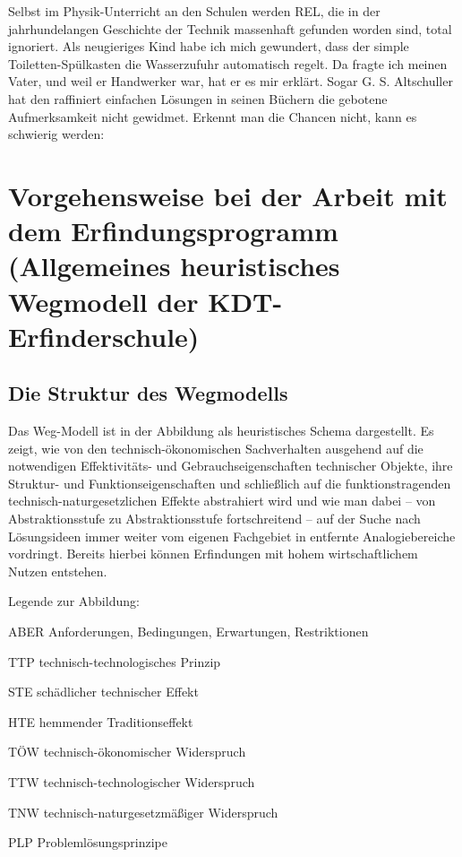 \documentclass[12pt,a4paper]{article}
\begin{document}
Selbst im Physik-Unterricht an den Schulen werden REL, die in der
jahrhundelangen Geschichte der Technik massenhaft gefunden worden sind, total
ignoriert. Als neugieriges Kind habe ich mich gewundert, dass der simple
Toiletten-Spülkasten die Wasserzufuhr automatisch regelt. Da fragte ich meinen
Vater, und weil er Handwerker war, hat er es mir erklärt. Sogar
G. S. Altschuller hat den raffiniert einfachen Lösungen in seinen Büchern die
gebotene Aufmerksamkeit nicht gewidmet. Erkennt man die Chancen nicht, kann es
schwierig werden:

\section{Vorgehensweise bei der Arbeit mit dem Erfindungsprogramm (Allgemeines
heuristisches Wegmodell der KDT-Erfinderschule)}

\subsection{Die Struktur des Wegmodells}

Das Weg-Modell ist in der Abbildung als heuristisches Schema dargestellt. Es
zeigt, wie von den technisch-ökonomischen Sachverhalten ausgehend auf die
notwendigen Effektivitäts- und Gebrauchseigenschaften technischer Objekte,
ihre Struktur- und Funktionseigenschaften und schließlich auf die
funktionstragenden technisch-naturgesetzlichen Effekte abstrahiert wird und
wie man dabei -- von Abstraktionsstufe zu Abstraktionsstufe fortschreitend –
auf der Suche nach Lösungsideen immer weiter vom eigenen Fachgebiet in
entfernte Analogiebereiche vordringt. Bereits hierbei können Erfindungen mit
hohem wirtschaftlichem Nutzen entstehen.

Legende zur Abbildung:


ABER       Anforderungen, Bedingungen, Erwartungen, Restriktionen

TTP          technisch-technologisches Prinzip

STE          schädlicher technischer Effekt

HTE          hemmender Traditionseffekt

TÖW         technisch-ökonomischer Widerspruch

TTW          technisch-technologischer Widerspruch

TNW          technisch-naturgesetzmäßiger Widerspruch

PLP           Problemlösungsprinzipe
\end{document}
